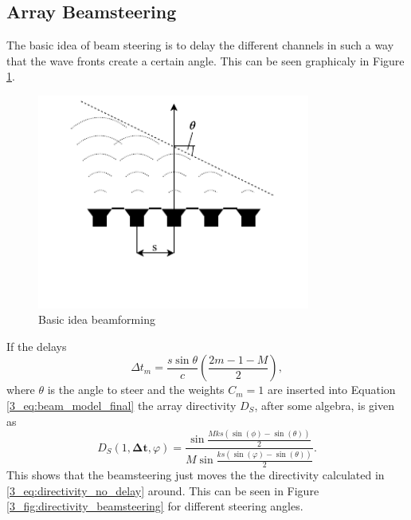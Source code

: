 \subsection{Array Beamsteering}
The basic idea of beam steering is to delay the different channels in such a way that the wave fronts create a certain angle. This can be seen graphicaly in Figure \ref{3_fig:basic_idea_beamforming}.
\begin{figure}
    \centering
    \includegraphics[trim=0mm 7mm 0mm 0mm, width=0.8\textwidth]{images/3_Parametric_array/Beamforming.pdf}
    \caption{Basic idea beamforming}
    \label{3_fig:basic_idea_beamforming}
\end{figure}
If the delays
\begin{equation}
    \Delta t_m = \frac{s \sin{\theta}}{c} \left ( \frac{2m - 1 - M}{2}\right ),
\end{equation}
where $\theta$ is the angle to steer and the weights $C_m = 1$ are inserted into Equation \ref{3_eq:beam_model_final}  
the array directivity $D_S$, after some algebra, is given as \cite{alma99116706330905515}
\begin{equation}
    D_S(1, \bm{\Delta t} , \varphi) 
    = 
    \frac{\sin{\frac{Mks(\sin{(\phi)} - \sin{(\theta)})}{2}}}{M\sin{\frac{ks(\sin{(\varphi)} - \sin{(\theta)})}{2}}}.
\end{equation}
This shows that the beamsteering just moves the the directivity calculated in \ref{3_eq:directivity_no_delay} around.  
This can be seen in Figure \ref{3_fig:directivity_beamsteering} for different steering angles.  
